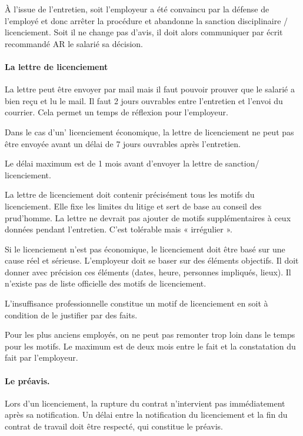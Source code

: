 À l’issue de l’entretien, soit l’employeur a été convaincu par la défense de l’employé et donc arrêter la procédure et abandonne la sanction disciplinaire / licenciement.
Soit il ne change pas d’avis, il doit alors communiquer par écrit recommandé AR le salarié sa décision.


\paragraph{La lettre de licenciement}

La lettre peut être envoyer par mail mais il faut pouvoir prouver que le salarié a bien reçu et lu le mail.
Il faut 2 jours ouvrables entre l’entretien et l’envoi du courrier.
Cela permet un temps de réflexion pour l’employeur.

Dans le cas d'un' licenciement économique, la lettre de licenciement ne peut pas être envoyée avant un délai de 7 jours ouvrables après l’entretien.

Le délai maximum est de 1 mois avant d’envoyer la lettre de sanction/ licenciement.

La lettre de licenciement doit contenir précisément tous les motifs du licenciement.
Elle fixe les limites du litige et sert de base au conseil des prud’homme.
La lettre ne devrait pas ajouter de motifs supplémentaires à ceux données pendant l’entretien.
C’est tolérable mais « irrégulier ».

Si le licenciement n’est pas économique, le licenciement doit être basé sur une cause réel et sérieuse.
L’employeur doit se baser sur des éléments objectifs.
Il doit donner avec précision ces éléments (dates, heure, personnes impliqués, lieux).
Il n’existe pas de liste officielle des motifs de licenciement.

L’insuffisance professionnelle constitue un motif de licenciement en soit à condition de le justifier par des faits.

Pour les plus anciens employés, on ne peut pas remonter trop loin dans le temps pour les motifs.
Le maximum est de deux mois entre le fait et la constatation du fait par l’employeur.


\paragraph{Le préavis.}
Lors d'un licenciement, la rupture du contrat n'intervient pas immédiatement après sa notification.
Un délai entre la notification du licenciement et la fin du contrat de travail doit être respecté, qui constitue le préavis.

